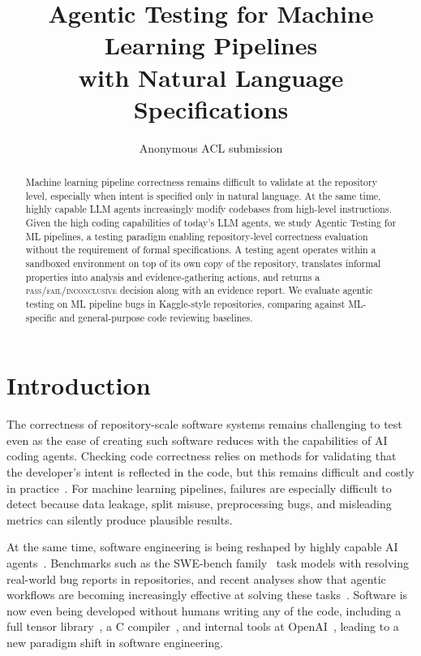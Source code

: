 \documentclass[11pt]{article}
\title{Agentic Testing for Machine Learning Pipelines\\with Natural Language Specifications}
\author{Anonymous ACL submission}
\begin{document}
\maketitle

\begin{abstract}
Machine learning pipeline correctness remains difficult to validate at the repository level, especially when intent is specified only in natural language.
At the same time, highly capable LLM agents increasingly modify codebases from high-level instructions.
Given the high coding capabilities of today's LLM agents, we study Agentic Testing for ML pipelines, a testing paradigm enabling repository-level correctness evaluation without the requirement of formal specifications.
A testing agent operates within a sandboxed environment on top of its own copy of the repository, translates informal properties into analysis and evidence-gathering actions, and returns a \textsc{pass}/\textsc{fail}/\textsc{inconclusive} decision along with an evidence report.
We evaluate agentic testing on ML pipeline bugs in Kaggle-style repositories, comparing against ML-specific and general-purpose code reviewing baselines.
\end{abstract}

\section{Introduction}

The correctness of repository-scale software systems remains challenging to test even as the ease of creating such software reduces with the capabilities of AI coding agents.
Checking code correctness relies on methods for validating that the developer's intent is reflected in the code, but this remains difficult and costly in practice~\citep{zeller2009why}.
For machine learning pipelines, failures are especially difficult to detect because data leakage, split misuse, preprocessing bugs, and misleading metrics can silently produce plausible results.

At the same time, software engineering is being reshaped by highly capable AI agents~\citep{metr2025longtasks}.
Benchmarks such as the SWE-bench family~\citep{jimenez2024swebench,swebench-verified} task models with resolving real-world bug reports in repositories, and recent analyses show that agentic workflows are becoming increasingly effective at solving these tasks~\citep{jimenez2024swebench,xia2024agentless,guo2025repoaudit}.
Software is now even being developed without humans writing any of the code, including a full tensor library~\citep{vibetensor}, a C compiler~\citep{carlini2026building}, and internal tools at OpenAI~\citep{lopopolo2026harness}, leading to a new paradigm shift in software engineering.
\end{document}
